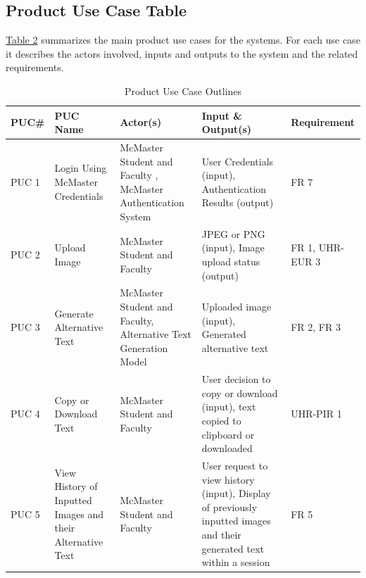 \documentclass[12pt]{article}
\begin{document}
\subsection{Product Use Case Table}
\href{tab:product-use}{Table 2} summarizes the main product use cases for the systems. For each use case it describes the actors involved, inputs and outputs to the system and the related requirements. 
  \label{tab:product-use}
    \begin{table}[H]
      \centering
      \caption{Product Use Case Outlines}
      \begin{tabular}{|p{1.3cm}|p{3.5cm}|p{3.5cm}|p{4cm}|p{2.8cm}|}
      \hline
      \textbf{PUC\#} & \textbf{PUC Name} & \textbf{Actor(s)} & \textbf{Input \& Output(s)} & \textbf{Requirement} \\ 
      \hline 
      PUC 1 & Login Using McMaster Credentials &  McMaster Student and Faculty , McMaster Authentication System & User Credentials (input), Authentication Results (output) & FR 7 \\
      \hline 
      PUC 2 & Upload Image & McMaster Student and Faculty & JPEG or PNG (input), Image upload status (output) & FR 1, UHR-EUR 3 \\
      \hline 
      PUC 3 & Generate Alternative Text &  McMaster Student and Faculty, Alternative Text Generation Model & Uploaded image (input), Generated alternative text  & FR 2, FR 3\\
      \hline
      PUC 4 & Copy or Download Text & McMaster Student and Faculty & User decision to copy or download (input), text copied to clipboard or downloaded & UHR-PIR 1\\ 
      \hline
      PUC 5 & View History of Inputted Images and their Alternative Text & McMaster Student and Faculty & User request to view history (input), Display of previously inputted images and their generated text within a session & FR 5\\
      \hline
\end{tabular}
\end{table}
\end{document}
